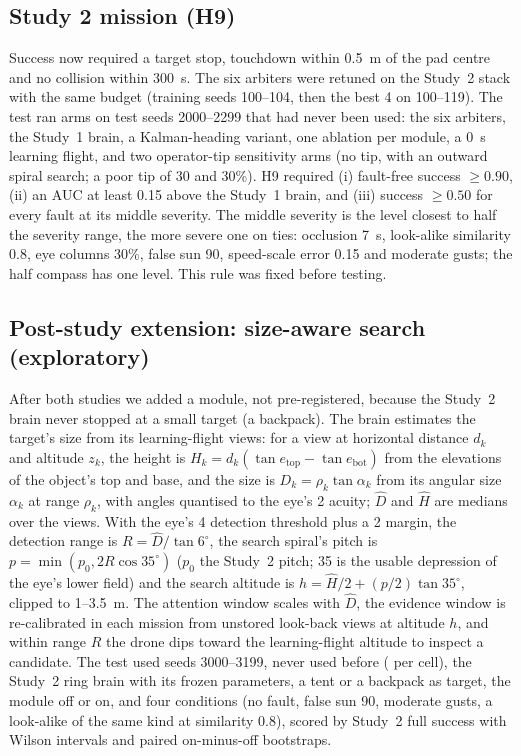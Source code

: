\documentclass[10pt,twocolumn]{article}
\begin{document}
\subsection{Study 2 mission (H9)}
Success now required a target stop, touchdown within 0.5~m of the pad centre and no collision within 300~s. The six arbiters were retuned on the Study~2 stack with the same budget (training seeds 100--104, then the best 4 on 100--119). The test ran \StwoNarms{} arms on test seeds 2000--2299 that had never been used: the six arbiters, the Study~1 brain, a Kalman-heading variant, one ablation per module, a 0~s learning flight, and two operator-tip sensitivity arms (no tip, with an outward spiral search; a poor tip of 30\textdegree{} and 30\%). H9 required (i) fault-free success $\geq 0.90$, (ii) an AUC at least 0.15 above the Study~1 brain, and (iii) success $\geq 0.50$ for every fault at its middle severity. The middle severity is the level closest to half the severity range, the more severe one on ties: occlusion 7~s, look-alike similarity 0.8, eye columns 30\%, false sun 90\textdegree, speed-scale error 0.15 and moderate gusts; the half compass has one level. This rule was fixed before testing.

\subsection{Post-study extension: size-aware search (exploratory)}
After both studies we added a module, not pre-registered, because the Study~2 brain never stopped at a small target (a backpack). The brain estimates the target's size from its learning-flight views: for a view at horizontal distance $d_k$ and altitude $z_k$, the height is $H_k = d_k(\tan e_{\mathrm{top}} - \tan e_{\mathrm{bot}})$ from the elevations of the object's top and base, and the size is $D_k = \rho_k \tan\alpha_k$ from its angular size $\alpha_k$ at range $\rho_k$, with angles quantised to the eye's 2\textdegree{} acuity; $\hat D$ and $\hat H$ are medians over the views. With the eye's 4\textdegree{} detection threshold plus a 2\textdegree{} margin, the detection range is $R = \hat D/\tan 6^\circ$, the search spiral's pitch is $p = \min(p_0, 2R\cos 35^\circ)$ ($p_0$ the Study~2 pitch; 35\textdegree{} is the usable depression of the eye's lower field) and the search altitude is $h = \hat H/2 + (p/2)\tan 35^\circ$, clipped to 1--3.5~m. The attention window scales with $\hat D$, the evidence window is re-calibrated in each mission from unstored look-back views at altitude $h$, and within range $R$ the drone dips toward the learning-flight altitude to inspect a candidate. The test used seeds 3000--3199, never used before (\ExtNseeds{} per cell), the Study~2 ring brain with its frozen parameters, a tent or a backpack as target, the module off or on, and four conditions (no fault, false sun 90\textdegree, moderate gusts, a look-alike of the same kind at similarity 0.8), scored by Study~2 full success with Wilson intervals and paired on-minus-off bootstraps.
\end{document}
